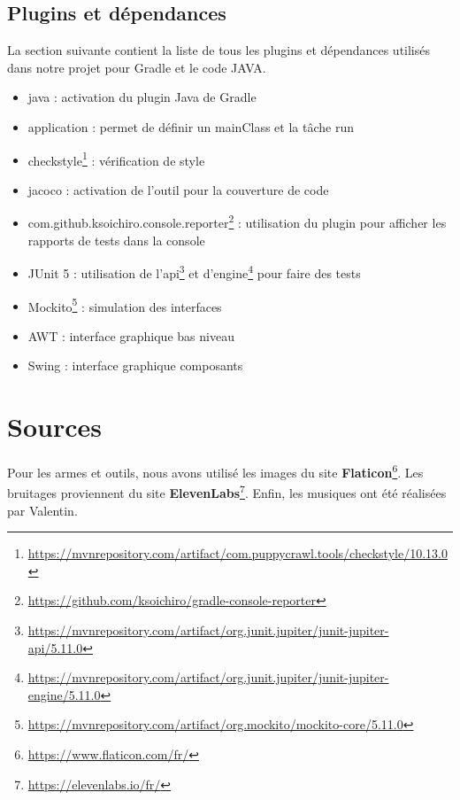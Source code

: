 \documentclass[a4paper, 12pt]{article}
\begin{document}
            \subsection{Plugins et dépendances}
                La section suivante contient la liste de tous les plugins et dépendances utilisés dans notre projet pour Gradle et le code JAVA.
                \begin{itemize}
                    \item java : activation du plugin Java de Gradle
                    \item application : permet de définir un mainClass et la tâche run
                    \item checkstyle\footnote{\href{https://mvnrepository.com/artifact/com.puppycrawl.tools/checkstyle/10.13.0}{https://mvnrepository.com/artifact/com.puppycrawl.tools/checkstyle/10.13.0}} : vérification de style
                    \item jacoco : activation de l'outil pour la couverture de code
                    \item com.github.ksoichiro.console.reporter\footnote{\href{https://github.com/ksoichiro/gradle-console-reporter}{https://github.com/ksoichiro/gradle-console-reporter}} : utilisation du plugin pour afficher les rapports de tests dans la console
                    \newline
                    \item JUnit 5 : utilisation de l'api\footnote{\href{https://mvnrepository.com/artifact/org.junit.jupiter/junit-jupiter-api/5.11.0}{https://mvnrepository.com/artifact/org.junit.jupiter/junit-jupiter-api/5.11.0}} et d'engine\footnote{\href{https://mvnrepository.com/artifact/org.junit.jupiter/junit-jupiter-engine/5.11.0}{https://mvnrepository.com/artifact/org.junit.jupiter/junit-jupiter-engine/5.11.0}} pour faire des tests
                    \item Mockito\footnote{\href{https://mvnrepository.com/artifact/org.mockito/mockito-core/5.11.0}{https://mvnrepository.com/artifact/org.mockito/mockito-core/5.11.0}} : simulation des interfaces
                    \item AWT : interface graphique bas niveau
                    \item Swing : interface graphique composants
                \end{itemize}


    \section{Sources}

        Pour les armes et outils, nous avons utilisé les images du site \textbf{Flaticon}\footnote{\href{https://www.flaticon.com/fr/}{https://www.flaticon.com/fr/}}.
        Les bruitages proviennent du site \textbf{ElevenLabs}\footnote{\href{https://elevenlabs.io/fr/}{https://elevenlabs.io/fr/}}.
        Enfin, les musiques ont été réalisées par Valentin.
\end{document}
